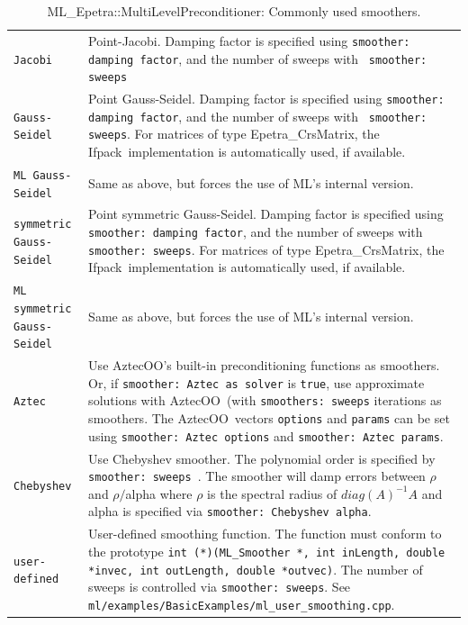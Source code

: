 \documentclass{article}[11pt]
\newcommand{\Aztecoo}  {{\sc AztecOO}}
\newcommand{\aztecoo}  {{\Aztecoo}}
\newcommand{\ifpack}  {{\sc Ifpack}}
\begin{document}
\begin{table}[tbh]
\begin{center}
\begin{tabular}{ | p{4.5cm} | p{10cm} | }
\hline
\verb!Jacobi! & Point-Jacobi. Damping factor is specified using
{\tt smoother: damping factor}, and the number of sweeps with {\tt
  smoother: sweeps} \\ 
\verb!Gauss-Seidel! & Point Gauss-Seidel.  Damping factor is specified using
{\tt smoother: damping factor}, and the number of sweeps with {\tt
 smoother: sweeps}.  For matrices of type Epetra\_CrsMatrix, the \ifpack\
implementation is automatically used, if available. \\
\verb!ML Gauss-Seidel! & Same as above, but forces the use of ML's internal
version.\\
\verb!symmetric Gauss-Seidel! & Point symmetric Gauss-Seidel.  Damping factor is specified using
{\tt smoother: damping factor}, and the number of sweeps with {\tt
 smoother: sweeps}.
For matrices of type Epetra\_CrsMatrix, the \ifpack\
implementation is automatically used, if available. \\
\verb!ML symmetric Gauss-Seidel! & Same as above, but forces the use of ML's
internal version.\\
\verb!Aztec! & Use \aztecoo's built-in preconditioning functions as
smoothers. Or, if {\tt smoother: Aztec as solver} is {\tt true},  use
approximate solutions with \aztecoo~(with {\tt smoothers: sweeps}
iterations as smoothers. 
The \aztecoo~vectors \verb!options! and {\tt params} can be set using
{\tt smoother: Aztec options} and {\tt smoother: Aztec params}. \\
\verb!Chebyshev! & Use Chebyshev smoother. The polynomial order is specified by {\tt
  \tt smoother: sweeps }. The smoother will damp errors between $\rho$ and $\rho/$alpha
  where $\rho$ is the spectral radius of $diag(A)^{-1} A$ and alpha is specified
  via {\tt smoother: Chebyshev alpha}.\\ 
\verb!user-defined! & User-defined smoothing function.  The function must conform to
the prototype {\tt int (*)(ML\_Smoother *, int inLength, double *invec, int outLength,
 double *outvec)}. The number of sweeps is controlled via {\tt smoother: sweeps}. See
{\tt ml/examples/BasicExamples/ml\_user\_smoothing.cpp}.\\
\hline
\end{tabular}
\caption{ML\_Epetra::MultiLevelPreconditioner: Commonly used smoothers.} 
\label{tab:ml:smoother}
\end{center}
\end{table}
\end{document}
